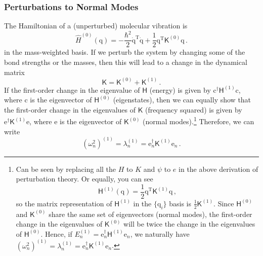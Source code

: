 \documentclass{article}
\theoremstyle{plain}\theoremheaderfont{\normalfont\itshape}\theorembodyfont{\rmfamily}\theoremseparator{.}\newtheorem*{rem}{Remark}\newtheorem*{ex}{Example}\newtheorem*{proof}{Proof}\newtheorem*{altp}{Alternative proof}
\theoremstyle{plain}\theoremheaderfont{\normalfont\bfseries}\theorembodyfont{\rmfamily}\theoremseparator{.}\newtheorem{thm}{Theorem}[section]\newtheorem{lem}[thm]{Lemma}\newtheorem{prop}[thm]{Proposition}\newtheorem*{cor}{Corollary}\newtheorem{defn}[thm]{Definition}\newtheorem{clm}[thm]{Claim}\newtheorem{clminproof}{Claim}
\theoremstyle{break}\theoremheaderfont{\normalfont\itshape}\theorembodyfont{\rmfamily}\theoremseparator{.\medskip}\newtheorem*{proofskip}{Proof}\newtheorem*{exs}{Examples}\newtheorem*{rems}{Remarks}
\theoremstyle{break}\theoremheaderfont{\normalfont\bfseries}\theorembodyfont{\rmfamily}\theoremseparator{.\medskip}\newtheorem{lemskip}[thm]{Lemma}\newtheorem{defnskip}[thm]{Definition}\newtheorem{propskip}[thm]{Proposition}\newtheorem{thmskip}[thm]{Theorem}
\numberwithin{equation}{section}
\newcommand{\tp}{^\mathrm{T}}
\newcommand{\vb}[1]{\bm{\mathrm{#1}}}
\begin{document}
    \subsubsection{Perturbations to Normal Modes}
    The Hamiltonian of a (unperturbed) molecular vibration is
    \begin{equation}
        \hat{H}^{(0)}(\vb{q})=-\frac{\hbar^2}{2}\dot{\vb{q}}\tp\dot{\vb{q}}+\frac{1}{2}\vb{q}\tp\mathsf{K}^{(0)}\vb{q}\,.
    \end{equation}
    in the mass-weighted basis. If we perturb the system by changing some of the bond strengths or the masses, then this will lead to a change in the dynamical matrix
    \begin{equation}
        \mathsf{K}=\mathsf{K}^{(0)}+\mathsf{K}^{(1)}\,.
    \end{equation}
    If the first-order change in the eigenvalue of \(\mathsf{H}\) (energy) is given by \(\vb{c}^\dagger\mathsf{H}^{(1)}\vb{c}\), where \(\vb{c}\) is the eigenvector of \(\mathsf{H}^{(0)}\) (eigenstates), then we can equally show that the first-order change in the eigenvalues of \(\mathsf{K}\) (frequency squared) is given by \(\vb{e}^\dagger\mathsf{K}^{(1)}\vb{e}\), where \(\vb{e}\) is the eigenvector of \(\mathsf{K}^{(0)}\) (normal modes).\footnote{Can be seen by replacing all the \(H\) to \(K\) and \(\psi\) to \(e\) in the above derivation of perturbation theory. Or equally, you can see
    \begin{equation}
        \mathsf{H}^{(1)}(\vb{q})=\frac{1}{2}\vb{q}\tp\mathsf{K}^{(1)}\vb{q}\,,
    \end{equation}
    so the matrix representation of \(\mathsf{H}^{(1)}\) in the \(\{\vb{q}_i\}\) basis is \(\frac{1}{2}\mathsf{K}^{(1)}\). Since \(\mathsf{H}^{(0)}\) and \(\mathsf{K}^{(0)}\) share the same set of eigenvectors (normal modes), the first-order change in the eigenvalues of \(\mathsf{K}^{(0)}\) will be twice the change in the eigenvalues of \(\mathsf{H}^{(0)}\). Hence, if \(E_n^{(1)}=\vb{e}_n^\dagger\mathsf{H}^{(1)}\vb{e}_n\), we naturally have \((\omega_n^2)^{(1)}=\lambda_n^{(1)}=\vb{e}_n^\dagger\mathsf{K}^{(1)}\vb{e}_n\).} Therefore, we can write
    \begin{equation}
        (\omega_n^2)^{(1)}=\lambda_n^{(1)}=\vb{e}_n^\dagger\mathsf{K}^{(1)}\vb{e}_n\,.
    \end{equation}
\end{document}
